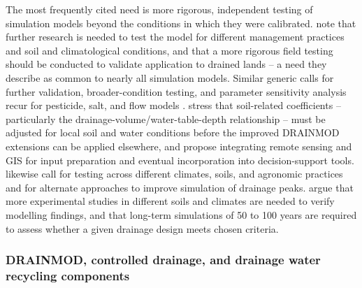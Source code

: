 \documentclass[11pt]{article}
\begin{document}
The most frequently cited need is more rigorous, independent testing of
simulation models beyond the conditions in which they were calibrated.
\textcite{Youssef2006} note that further research is needed to test the model for
different management practices and soil and climatological conditions, and that a
more rigorous field testing should be conducted to validate application to
drained lands -- a need they describe as common to nearly all simulation models.
Similar generic calls for further validation, broader-condition testing, and
parameter sensitivity analysis recur for pesticide, salt, and flow models
\parencite{Branger2009,Hirekhan2007,Yang2008b,Xian2017}. \textcite{Yang2008b}
stress that soil-related coefficients -- particularly the drainage-volume/water-table-depth
relationship -- must be adjusted for local soil and water conditions before the
improved DRAINMOD extensions can be applied elsewhere, and propose integrating
remote sensing and GIS for input preparation and eventual incorporation into
decision-support tools. \textcite{Xian2017} likewise call for testing across
different climates, soils, and agronomic practices and for alternate approaches
to improve simulation of drainage peaks. \textcite{Mendez2004} argue that more
experimental studies in different soils and climates are needed to verify
modelling findings, and that long-term simulations of 50 to 100 years are
required to assess whether a given drainage design meets chosen criteria.

\subsubsection{DRAINMOD, controlled drainage, and drainage water recycling components}
\end{document}

